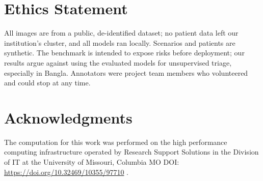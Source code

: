 \documentclass[11pt]{article}
\begin{document}
\section*{Ethics Statement}
All images are from a public, de-identified dataset; no patient data left our institution's cluster, and all models ran locally. Scenarios and patients are synthetic. The benchmark is intended to expose risks before deployment; our results argue against using the evaluated models for unsupervised triage, especially in Bangla. Annotators were project team members who volunteered and could stop at any time.

\section*{Acknowledgments}
The computation for this work was performed on the high performance computing infrastructure operated by Research Support Solutions in the Division of IT at the University of Missouri, Columbia MO DOI: \url{https://doi.org/10.32469/10355/97710} \citep{hellbender}.




\clearpage

\end{document}
